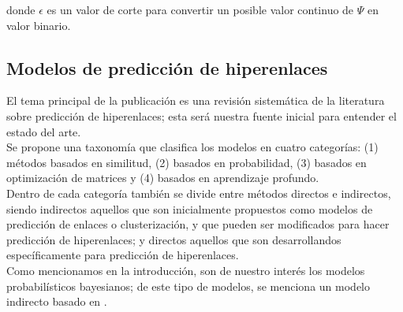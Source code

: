 donde $\epsilon$ es un valor de corte para convertir un posible valor continuo de $\Psi$ en valor binario.\\

\subsection{Modelos de predicción de hiperenlaces}

El tema principal de la publicación es una revisión sistemática de la literatura sobre predicción de hiperenlaces; esta será nuestra fuente inicial para entender el estado del arte.\\

Se propone una taxonomía que clasifica los modelos en cuatro categorías: (1) métodos basados en similitud, (2) basados en probabilidad, (3) basados en optimización de matrices y (4) basados en aprendizaje profundo.\\

Dentro de cada categoría también se divide entre métodos directos e indirectos, siendo indirectos aquellos que son inicialmente propuestos como modelos de predicción de enlaces o clusterización, y que pueden ser modificados para hacer predicción de hiperenlaces; y directos aquellos que son desarrollandos específicamente para predicción de hiperenlaces.\\

Como mencionamos en la introducción, son de nuestro interés los modelos probabilísticos bayesianos; de este tipo de modelos, se menciona un modelo indirecto basado en \cite{NIPS2005_182e6c2d}.\\